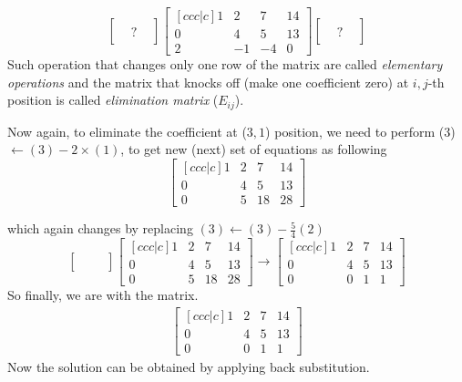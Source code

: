 \documentclass{article}
\begin{document}
\[
\begin{bmatrix}
    & & \\
    &? & \\
    & &
\end{bmatrix} \begin{bmatrix}[ccc|c]
    1 & 2 & 7 & 14\\
    0 & 4 & 5 & 13 \\
    2 & -1 & -4 & 0
\end{bmatrix} \begin{bmatrix}
    & & \\
    &? & \\
    & &
\end{bmatrix}
\]
Such operation that changes only one row of the matrix are called \textit{elementary operations} and the matrix that knocks off (make one coefficient zero) at $i,j$-th position is called \textit{elimination matrix} ($E_{ij}$).

Now again, to eliminate the coefficient at ($3,1$) position, we need to perform (3) $\longleftarrow (3) - 2\times (1) $, to get new (next) set of equations as following
\[
\begin{bmatrix}[ccc|c]
    1 & 2 & 7 & 14\\
    0 & 4 & 5 & 13 \\
    0 & 5 & 18 & 28
\end{bmatrix}
\]

which again changes by replacing $(3) \longleftarrow (3) - \frac{5}{4}(2) $
\[
\begin{bmatrix}
    & & \\
    & & \\
    & &
\end{bmatrix}
\begin{bmatrix}[ccc|c]
    1 & 2 & 7 & 14\\
    0 & 4 & 5 & 13 \\
    0 & 5 & 18 & 28
\end{bmatrix} \longrightarrow \begin{bmatrix}[ccc|c]
                                1 & 2 & 7 & 14\\
                                0 & 4 & 5 & 13\\
                                0 & 0 & 1 & 1
                              \end{bmatrix}
\]
So finally, we are with the matrix.\\
\begin{align}
\begin{bmatrix}[ccc|c] 
1 & 2 & 7 & 14 \\
0 & 4 & 5 & 13 \\
0 & 0 & 1 & 1
\end{bmatrix}
\end{align}\label{GE1}
Now the solution can be obtained by applying back substitution.\\
\end{document}
